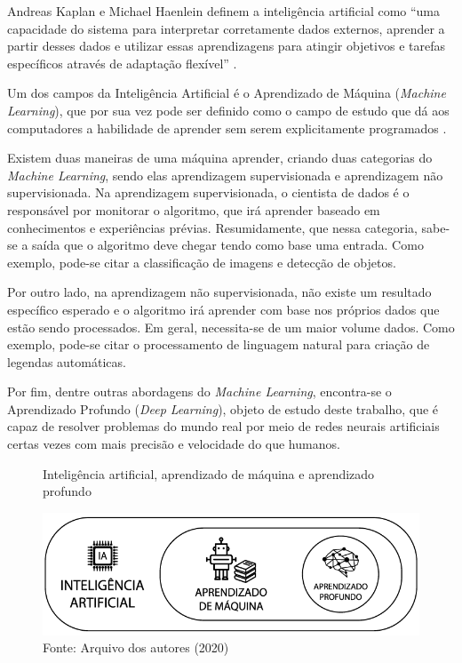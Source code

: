 \par Andreas Kaplan e Michael Haenlein definem a inteligência artificial como “uma capacidade do sistema para interpretar corretamente dados externos, aprender a partir desses dados e utilizar essas aprendizagens para atingir objetivos e tarefas específicos através de adaptação flexível” \cite{Kaplan2019}.

\par Um dos campos da Inteligência Artificial é o Aprendizado de Máquina (\textit{Machine Learning}), que por sua vez pode ser definido como o campo de estudo que dá aos computadores a habilidade de aprender sem serem explicitamente programados \cite{Samuel1967}.

\par Existem duas maneiras de uma máquina aprender, criando duas categorias do \textit{Machine Learning}, sendo elas aprendizagem supervisionada e aprendizagem não supervisionada. Na aprendizagem supervisionada, o cientista de dados é o responsável por monitorar o algoritmo, que irá aprender baseado em conhecimentos e experiências prévias. Resumidamente, que nessa categoria, sabe-se a saída que o algoritmo deve chegar tendo como base uma entrada. Como exemplo, pode-se citar a classificação de imagens e detecção de objetos.

\par Por outro lado, na aprendizagem não supervisionada, não existe um resultado específico esperado e o algoritmo irá aprender com base nos próprios dados que estão sendo processados. Em geral, necessita-se de um maior volume dados. Como exemplo, pode-se citar o processamento de linguagem natural para criação de legendas automáticas.

\par Por fim, dentre outras abordagens do \textit{Machine Learning}, encontra-se o Aprendizado Profundo (\textit{Deep Learning}), objeto de estudo deste trabalho, que é capaz de resolver problemas do mundo real por meio de redes neurais artificiais certas vezes com mais precisão e velocidade do que humanos.

\begin{figure}[H]
    \centering
    \caption{Inteligência artificial, aprendizado de máquina e aprendizado profundo}
    \includegraphics[width=1.0\linewidth]{Imagens/deep.png}
    \caption*{Fonte: Arquivo dos autores (2020)}
    \label{autoai-results}
\end{figure}

